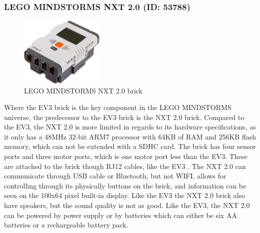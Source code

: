\subsubsection{LEGO MINDSTORMS NXT 2.0 (ID: 53788)}
\begin{figure}[H]
  \centering
  \includegraphics[width=4cm]{images/techAnalysis/LegoNXT2.jpg}
  \caption{LEGO MINDSTORMS NXT 2.0 brick \cite{BrickOWl-figure-NXT2}}\label{fig:sssec:LEGONXT2-NXT2}
\end{figure}
Where the EV3 brick is the key component in the LEGO MINDSTORMS universe, the predecessor to the EV3 brick is the NXT 2.0 brick.
Compared to the EV3, the NXT 2.0 is more limited in regards to its hardware specifications, as it only has a 48MHz 32-bit ARM7 processor with 64KB of RAM and 256KB flash memory, which can not be extended with a SDHC card.
The brick has four sensor ports and three motor ports, which is one motor port less than the EV3.
These are attached to the brick though RJ12 cables, like the EV3 \cite{LEGO_ev3_nodate}.
The NXT 2.0 can communicate through USB cable or Bluetooth, but not WIFI, allows for controlling through its physically buttons on the brick, and information can be seen on the 100x64 pixel built-in display.
Like the EV3 the NXT 2.0 brick also have speakers, but the sound quality is not as good.
Like the EV3, the NXT 2.0 can be powered by power supply or by batteries which can either be six AA batteries or a rechargeable battery pack. \cite{montes_real-time_2019, lego_mindstorms_2009}
